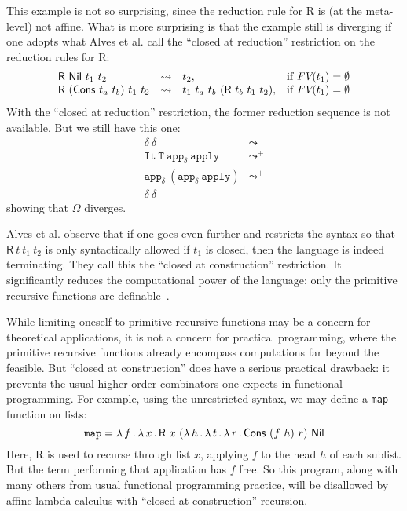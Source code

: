 \documentclass{article}
\begin{document}
This example is not so surprising, since the reduction rule for
\textsf{R} is (at the meta-level) not affine.  What is more surprising
is that the example still is diverging if one adopts what Alves et al.
call the ``closed at reduction'' restriction on the reduction
rules for \textsf{R}:
  \[
  \begin{array}{lllll}
    \mathsf{R}\ \mathsf{Nil}\ t_1\ t_2 & \leadsto & t_2, & \textnormal{if } \textit{FV}(t_1) = \emptyset\\
    \mathsf{R}\ (\mathsf{Cons}\ t_a\ t_b)\ t_1\ t_2 & \leadsto & t_1\ t_a\ t_b\ (\mathsf{R}\ t_b\ t_1\ t_2),& \textnormal{if } \textit{FV}(t_1) = \emptyset
  \end{array}
  \]
\noindent With the ``closed at reduction'' restriction, the former
reduction sequence is not available.  But we still have this one:
\[
\begin{array}{ll}
  \delta\ \delta & \leadsto \\
  \texttt{It}\ \texttt{T}\ \texttt{app}_\delta\ \texttt{apply} & \leadsto^+ \\
  \texttt{app}_\delta\ (\texttt{app}_\delta\ \texttt{apply}) & \leadsto^+ \\
  \delta\ \delta& \
\end{array}
\]
\noindent showing that $\Omega$ diverges.

Alves et al. observe that if one goes even further and restricts the
syntax so that $\mathsf{R}\ t\ t_1\ t_2$ is only syntactically allowed
if $t_1$ is closed, then the language is indeed terminating.  They
call this the ``closed at construction'' restriction.  It
significantly reduces the computational power of the language: only
the primitive recursive functions are definable~\cite{alves10}.

While limiting oneself to primitive recursive functions may be a
concern for theoretical applications, it is not a concern for
practical programming, where the primitive recursive functions already
encompass computations far beyond the feasible.  But ``closed at construction''
does have a serious practical drawback: it prevents the usual higher-order
combinators one expects in functional programming.  For example, using the
unrestricted syntax, we may define a \texttt{map} function on lists:
\[
\texttt{map} = \lam{f}{\lam{x}{\mathsf{R}\ x\ (\lam{h}{\lam{t}{\lam{r}{\mathsf{Cons}\ (f\ h)\ r}}})\ \mathsf{Nil}}}
\]
\noindent Here, \textsf{R} is used to recurse through list $x$,
applying $f$ to the head $h$ of each sublist.  But the term performing
that application has $f$ free.  So this program, along with many
others from usual functional programming practice, will be disallowed
by affine lambda calculus with ``closed at construction'' recursion.
\end{document}

